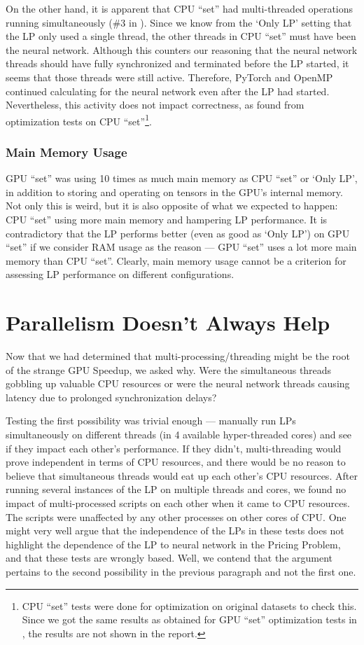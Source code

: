 On the other hand, it is apparent that CPU ``set'' had multi-threaded operations running simultaneously (\#3 in ). Since we know from the `Only LP' setting that the LP only used a single thread, the other threads in CPU ``set'' must have been the neural network. Although this counters our reasoning that the neural network threads should have fully synchronized and terminated before the LP started, it seems that those threads were still active. Therefore, PyTorch and OpenMP continued calculating for the neural network even after the LP had started. Nevertheless, this activity does not impact correctness, as found from optimization tests on CPU ``set''\footnote{CPU ``set'' tests were done for optimization on original datasets to check this. Since we got the same results as obtained for GPU ``set'' optimization tests in , the results are not shown in the report.}.

\subsubsection{Main Memory Usage}
GPU ``set'' was using 10 times as much main memory as CPU ``set'' or `Only LP', in addition to storing and operating on tensors in the GPU's internal memory. Not only this is weird, but it is also opposite of what we expected to happen: CPU ``set'' using more main memory and hampering LP performance. It is contradictory that the LP performs better (even as good as `Only LP') on GPU ``set'' if we consider RAM usage as the reason --- GPU ``set'' uses a lot more main memory than CPU ``set''. Clearly, main memory usage cannot be a criterion for assessing LP performance on different configurations.

\section{Parallelism Doesn't Always Help} \label{app:Parallelism Doesn't Always Help}
Now that we had determined that multi-processing/threading might be the root of the strange GPU Speedup, we asked why. Were the simultaneous threads gobbling up valuable CPU resources or were the neural network threads causing latency due to prolonged synchronization delays?

Testing the first possibility was trivial enough --- manually run LPs simultaneously on different threads (in 4 available hyper-threaded cores) and see if they impact each other's performance. If they didn't, multi-threading would prove independent in terms of CPU resources, and there would be no reason to believe that simultaneous threads would eat up each other's CPU resources. After running several instances of the LP on multiple threads and cores, we found no impact of multi-processed scripts on each other when it came to CPU resources. The scripts were unaffected by any other processes on other cores of CPU. One might very well argue that the independence of the LPs in these tests does not highlight the dependence of the LP to neural network in the Pricing Problem, and that these tests are wrongly based. Well, we contend that the argument pertains to the second possibility in the previous paragraph and not the first one. 

